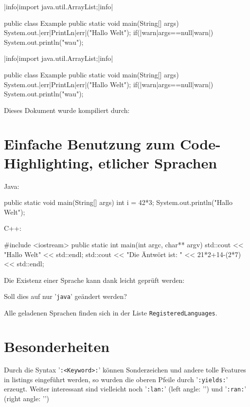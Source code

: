\documentclass{article}
\begin{document}
\begin{java}
|info|import java.util.ArrayList;|info|

public class Example {
    public static void main(String[] args) { 
        System.out.|err|PrintLn|err|("Hallo Welt");
        if(|warn|args==null|warn|)
            System.out.println("wau");
    }
}
\end{java}
\begin{latex}
\begin{java}
|info|import java.util.ArrayList;|info|

public class Example {
    public static void main(String[] args) { 
        System.out.|err|PrintLn|err|("Hallo Welt");
        if(|warn|args==null|warn|)
            System.out.println("wau");
    }
}
\end{java}
\end{latex}

\begin{bemerkung}[Kompilierung]
    Dieses Dokument wurde kompiliert durch: \begin{center}
    \end{center}
\end{bemerkung}

\section{Einfache Benutzung zum Code-Highlighting, etlicher Sprachen}
Java:
\begin{java}
public static void main(String[] args) {
    int i = 42*3;
    System.out.println("Hallo Welt");
}
\end{java}
C++:
\begin{cpp}
#include <iostream>
public static int main(int argc, char** argv) {
    std::cout << "Hallo Welt" << std::endl;
    std::cout << "Die Äntwört ist: " << 21*2+14-(2*7) << std::endl;
}
\end{cpp}
Die Existenz einer Sprache kann dank  leicht geprüft werden:
\begin{latex}
\end{latex}
\begin{bemerkung}[Notation]
    Soll dies auf nur '\verb|java|' geändert werden?
\end{bemerkung}
Alle geladenen Sprachen finden sich in der Liste \verb|RegisteredLanguages|.
\section{Besonderheiten}
Durch die Syntax '\verb|:<Keyword>:|' können Sonderzeichen und andere tolle Features in listings eingeführt werden, so wurden die oberen Pfeile durch '\verb|:yields:|' erzeugt. Weiter interessant sind vielleicht noch '\verb|:lan:|' (left angle: '') und '\verb|:ran:|' (right angle: '')
\end{document}
